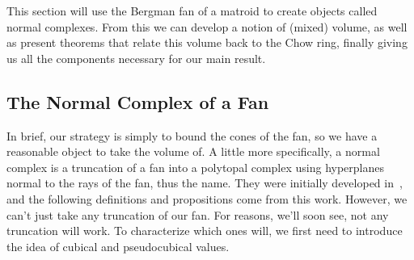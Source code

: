 \documentclass[12pt,oneside]{../../sfsuthesis}
\begin{document}
This section will use the Bergman fan of a matroid to create objects called  normal complexes.
From this we can develop a notion of (mixed) volume, as well as present theorems that relate this volume back to the Chow ring, finally giving us all the components necessary for our main result.

\subsection{The Normal Complex of a Fan}
In brief, our strategy is simply to bound the cones of the fan, so we have a reasonable object to take the volume of.
A little more specifically, a normal complex is a truncation of a fan into a polytopal complex using hyperplanes normal to the rays of the fan, thus the name.
They were initially developed in~\cite{nathansonTropicalFansNormal2023}, and the following definitions and propositions come from this work.
However, we can't just take any truncation of our fan.
For reasons, we'll soon see, not any truncation will work.
To characterize which ones will, we first need to introduce the idea of cubical and pseudocubical values.
\end{document}
